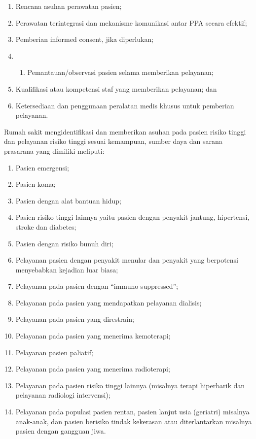 \documentclass[
]{book}
\providecommand{\tightlist}{%
  \setlength{\itemsep}{0pt}\setlength{\parskip}{0pt}}
\begin{document}
\begin{enumerate}
\def\labelenumi{\alph{enumi}.}
\item
  Rencana asuhan perawatan pasien;
\item
  Perawatan terintegrasi dan mekanisme komunikasi antar PPA secara efektif;
\item
  Pemberian informed consent, jika diperlukan;
\item
  \begin{enumerate}
  \def\labelenumii{\alph{enumii})}
  \setcounter{enumii}{3}
  \tightlist
  \item
    Pemantauan/observasi pasien selama memberikan pelayanan;
  \end{enumerate}
\item
  Kualifikasi atau kompetensi staf yang memberikan pelayanan; dan
\item
  Ketersediaan dan penggunaan peralatan medis khusus untuk pemberian pelayanan.
\end{enumerate}

Rumah sakit mengidentifikasi dan memberikan asuhan pada pasien risiko tinggi dan pelayanan risiko tinggi sesuai kemampuan, sumber daya dan sarana prasarana yang dimiliki meliputi:

\begin{enumerate}
\def\labelenumi{\alph{enumi}.}
\tightlist
\item
  Pasien emergensi;
\item
  Pasien koma;
\item
  Pasien dengan alat bantuan hidup;
\item
  Pasien risiko tinggi lainnya yaitu pasien dengan penyakit jantung, hipertensi, stroke dan diabetes;
\item
  Pasien dengan risiko bunuh diri;
\item
  Pelayanan pasien dengan penyakit menular dan penyakit yang berpotensi menyebabkan kejadian luar biasa;
\item
  Pelayanan pada pasien dengan ``immuno-suppressed'';
\item
  Pelayanan pada pasien yang mendapatkan pelayanan dialisis;
\item
  Pelayanan pada pasien yang direstrain;
\item
  Pelayanan pada pasien yang menerima kemoterapi;
\item
  Pelayanan pasien paliatif;
\item
  Pelayanan pada pasien yang menerima radioterapi;
\item
  Pelayanan pada pasien risiko tinggi lainnya (misalnya terapi hiperbarik dan pelayanan radiologi intervensi);
\item
  Pelayanan pada populasi pasien rentan, pasien lanjut usia (geriatri) misalnya anak-anak, dan pasien berisiko tindak kekerasan atau diterlantarkan misalnya pasien dengan gangguan jiwa.
\end{enumerate}
\end{document}

